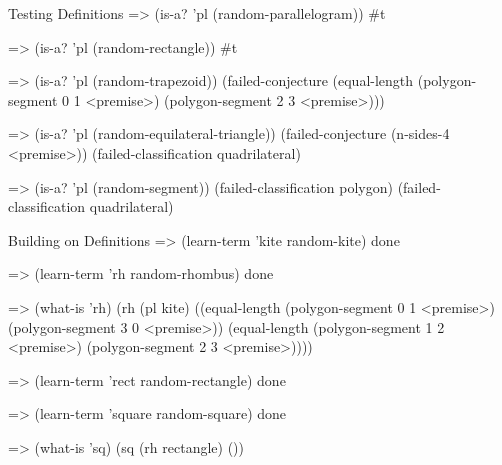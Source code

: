 \begin{repl-example}{Testing Definitions}
=> (is-a? 'pl (random-parallelogram))
#t

=> (is-a? 'pl (random-rectangle))
#t

=> (is-a? 'pl (random-trapezoid))
(failed-conjecture
 (equal-length (polygon-segment 0 1 <premise>)
               (polygon-segment 2 3 <premise>)))

=> (is-a? 'pl (random-equilateral-triangle))
(failed-conjecture (n-sides-4 <premise>))
(failed-classification quadrilateral)

=> (is-a? 'pl (random-segment))
(failed-classification polygon)
(failed-classification quadrilateral)
\end{repl-example}

\begin{repl-example}{Building on Definitions}
=> (learn-term 'kite random-kite)
done

=> (learn-term 'rh random-rhombus)
done

=> (what-is 'rh)
(rh
 (pl kite)
 ((equal-length (polygon-segment 0 1 <premise>)
                (polygon-segment 3 0 <premise>))
  (equal-length (polygon-segment 1 2 <premise>)
                (polygon-segment 2 3 <premise>))))

=> (learn-term 'rect random-rectangle)
done

=> (learn-term 'square random-square)
done

=> (what-is 'sq)
(sq (rh rectangle) ())
\end{repl-example}
